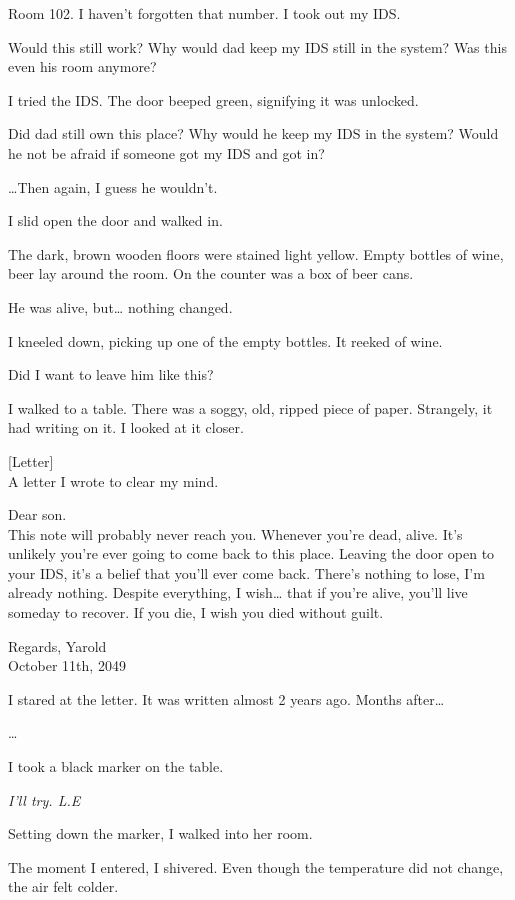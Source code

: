 Room 102. I haven’t forgotten that number. I took out my IDS. 

Would this still work? Why would dad keep my IDS still in the system? Was this even his room anymore?

I tried the IDS. The door beeped green, signifying it was unlocked.

Did dad still own this place? Why would he keep my IDS in the system? Would he not be afraid if someone got my IDS and got in?

…Then again, I guess he wouldn’t.

I slid open the door and walked in.

The dark, brown wooden floors were stained light yellow. Empty bottles of wine, beer lay around the room. On the counter was a box of beer cans. 

He was alive, but… nothing changed.

I kneeled down, picking up one of the empty bottles. It reeked of wine.

Did I want to leave him like this?

I walked to a table. There was a soggy, old, ripped piece of paper. Strangely, it had writing on it. I looked at it closer.

[Letter] \\
A letter I wrote to clear my mind.

Dear son. \\
\indent This note will probably never reach you. Whenever you’re dead, alive. It's unlikely you’re ever going to come back to this place. Leaving the door open to your IDS, it's a belief that you’ll ever come back. There’s nothing to lose, I’m already nothing. Despite everything, I wish… that if you’re alive, you’ll live someday to recover. If you die, I wish you died without guilt. 
					
\begin{flushright}
    Regards, Yarold \\
    October 11th, 2049
\end{flushright}


I stared at the letter. It was written almost 2 years ago. Months after…

…

I took a black marker on the table.

\textit{I’ll try. L.E}

Setting down the marker, I walked into her room. 

The moment I entered, I shivered. Even though the temperature did not change, the air felt colder.

